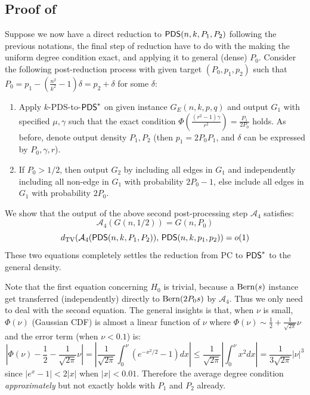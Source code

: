 \documentclass[final,12pt]{colt2023} %
\newcommand\1[1]{\mathbb{I}_{\left\{#1\right\}}}
\begin{document}
\subsection{Proof of }
Suppose we now have a direct reduction to $\mathsf{PDS}(n, k, P_1, P_2)$ following the previous notations,
the final step of reduction have to do with the making the uniform degree condition exact, and applying it to general (dense) $P_0$. Consider the following post-reduction process with given target $(P_0, p_1, p_2)$ such that $P_0=p_1-(\frac{n^2}{k^2}-1)\delta=p_2+\delta$ for some $\delta$:
\begin{enumerate}
    \item Apply $k$-PDS-to-$\mathsf{PDS}^*$ on given instance $G_E(n, k, p, q)$ and output $G_1$ with specified $\mu, \gamma$ such that the exact condition $\Phi(\frac{(r^2-1)\gamma}{r^2})=\frac{P_1}{2P_0}$ holds. As before, denote output density $P_1, P_2$ (then $p_1=2P_0P_1$, and $\delta$ can be expressed by $P_0, \gamma, r$).
    \item If $P_0>1/2$, then output $G_2$ by including all edges in $G_1$ and independently including all non-edge in $G_1$ with probability $2P_0-1$, else include all edges in $G_1$ with probability $2P_0$. 
\end{enumerate}
We show that the output of the above second post-processing step $\mathcal{A}_4$ satisfies:
$$\mathcal{A}_4(G(n, 1/2))=G(n, P_0)$$
$$d_{\rm TV}(\mathcal{A}_4(\mathsf{PDS}(n, k, P_1, P_2)),\, \mathsf{PDS}(n, k, p_1, p_2))=o(1)$$
These two equations completely settles the reduction from PC to $\mathsf{PDS}^*$ to the general density.

\spac Note that the first equation concerning $H_0$ is trivial, because a ${\rm Bern}(s)$ instance get transferred (independently) directly to ${\rm Bern}(2P_0s)$ by $\mathcal{A}_4$. Thus we only need to deal with the second equation. The general insights is that, when $\nu$ is small, $\Phi(\nu)$ (Gaussian CDF) is almost a linear function of $\nu$ where $\Phi(\nu)\sim \frac{1}{2}+\frac{1}{\sqrt{2\pi}}\nu$ and the error term (when $\nu<0.1$) is: $$\left|\Phi(\nu)-\frac{1}{2}-\frac{1}{\sqrt{2\pi}}\nu\right|=\left|\frac{1}{\sqrt{2\pi}}\int_0^{\nu}(e^{-x^2/2}-1)dx\right|\leq \frac{1}{\sqrt{2\pi}}\left|\int_0^{\nu} x^2dx\right|=\frac{1}{3\sqrt{2\pi}}|\nu|^3$$since $|e^x-1|<2|x|$ when $|x|<0.01$. Therefore the average degree condition \emph{approximately} but not exactly holds with $P_1$ and $P_2$ already.
\end{document}
